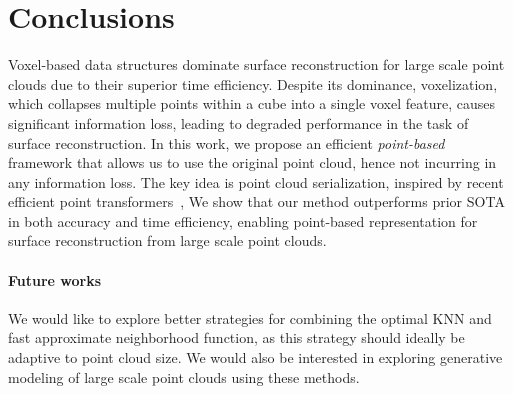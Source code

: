 \section{Conclusions}
Voxel-based data structures dominate surface reconstruction for large scale point clouds due to their superior time efficiency.
Despite its dominance, voxelization, which collapses multiple points within a cube into a single voxel feature, causes significant information loss, leading to degraded performance in the task of surface reconstruction.
In this work, we propose an efficient \textit{point-based} framework that allows us to use the original point cloud, hence not incurring in any information loss.
The key idea is point cloud serialization, inspired by recent efficient point transformers~\cite{wu2024point, wang2023octformer}, 
We show that our method outperforms prior SOTA in both accuracy and time efficiency, enabling point-based representation for surface reconstruction from large scale point clouds.  

\paragraph{Future works}
We would like to explore better strategies for combining the optimal KNN and fast approximate neighborhood function, as this strategy should ideally be adaptive to point cloud size.
We would also be interested in exploring generative modeling of large scale point clouds using these methods.
